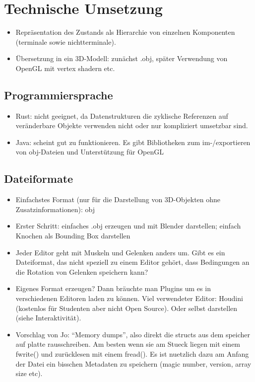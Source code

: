 \chapter{Technische Umsetzung}

\begin{itemize}
 \item Repräsentation des Zustands als Hierarchie von einzelnen Komponenten (terminale sowie nichtterminale).
 \item Übersetzung in ein 3D-Modell: zunächst .obj, später Verwendung von OpenGL mit vertex shadern etc.\
\end{itemize}


\section{Programmiersprache}

\begin{itemize}
 \item Rust: nicht geeignet, da Datenstrukturen die zyklische Referenzen auf veränderbare Objekte verwenden nicht oder nur kompliziert umsetzbar sind.
 \item Java: scheint gut zu funktionieren. Es gibt Bibliotheken zum im-/exportieren von obj-Dateien und Unterstützung für OpenGL
\end{itemize}


\section{Dateiformate}

\begin{itemize}
 \item Einfachstes Format (nur für die Darstellung von 3D-Objekten ohne Zusatzinformationen): obj
 \item Erster Schritt: einfaches .obj erzeugen und mit Blender darstellen; einfach Knochen als Bounding Box darstellen
 \item Jeder Editor geht mit Muskeln und Gelenken anders um. Gibt es ein Dateiformat, das nicht speziell zu einem Editor gehört, dass Bedingungen an die Rotation von Gelenken speichern kann?
 \item Eigenes Format erzeugen? Dann bräuchte man Plugins um es in verschiedenen Editoren laden zu können. Viel verwendeter Editor: Houdini (kostenlos für Studenten aber nicht Open Source). Oder selbst darstellen (siehe Interaktivität).
\item Vorschlag von Jo: "`Memory dumps"', also direkt die structs aus dem speicher auf platte rausschreiben. Am besten wenn sie am Stueck liegen mit einem fwrite() und zurücklesen mit einem fread(). Es ist nuetzlich dazu am Anfang der Datei ein bisschen Metadaten zu speichern (magic number, version, array size etc).
\end{itemize}

